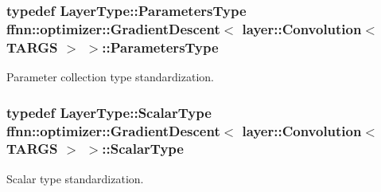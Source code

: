 \hypertarget{classffnn_1_1optimizer_1_1_gradient_descent_3_01layer_1_1_convolution_3_01_t_a_r_g_s_01_4_01_4_a0bbe4560ab81eacf8e75ac5510ad696e}{
\subsubsection[{Parameters\-Type}]{\setlength{\rightskip}{0pt plus 5cm}typedef Layer\-Type\-::\-Parameters\-Type {\bf ffnn\-::optimizer\-::\-Gradient\-Descent}$<$ {\bf layer\-::\-Convolution}$<$ {\bf T\-A\-R\-G\-S} $>$ $>$\-::{\bf Parameters\-Type}}}\label{classffnn_1_1optimizer_1_1_gradient_descent_3_01layer_1_1_convolution_3_01_t_a_r_g_s_01_4_01_4_a0bbe4560ab81eacf8e75ac5510ad696e}


Parameter collection type standardization. 

\hypertarget{classffnn_1_1optimizer_1_1_gradient_descent_3_01layer_1_1_convolution_3_01_t_a_r_g_s_01_4_01_4_a041c24c2e8946fd3cc93f9094930250e}{
\subsubsection[{Scalar\-Type}]{\setlength{\rightskip}{0pt plus 5cm}typedef Layer\-Type\-::\-Scalar\-Type {\bf ffnn\-::optimizer\-::\-Gradient\-Descent}$<$ {\bf layer\-::\-Convolution}$<$ {\bf T\-A\-R\-G\-S} $>$ $>$\-::{\bf Scalar\-Type}}}\label{classffnn_1_1optimizer_1_1_gradient_descent_3_01layer_1_1_convolution_3_01_t_a_r_g_s_01_4_01_4_a041c24c2e8946fd3cc93f9094930250e}


Scalar type standardization. 

